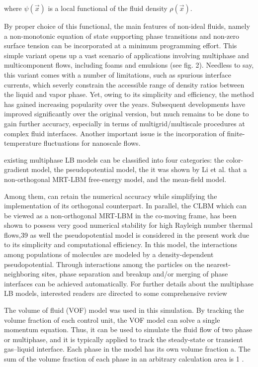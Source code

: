 where $\psi(\vec{x})$ is a local functional of the fluid density $\rho(\vec{x})$.

By proper choice of this functional, the main features of non-ideal fluids, namely a non-monotonic equation of state supporting phase transitions and non-zero surface tension can be incorporated at a minimum programming effort. This simple variant opens up a vast scenario of applications involving multiphase and multicomponent flows, including foams and emulsions (see fig. 2). Needless to say, this variant comes with a number of limitations, such as spurious interface currents, which severly constrain the accessible range of density ratios between the liquid and vapor phase. Yet, owing to its simplicity and efficiency, the method has gained increasing popularity over the years. Subsequent developments have improved significantly over the original version, but much remains to be done to gain further accuracy, especially in terms of multigrid/multiscale procedures at complex fluid interfaces. Another important issue is the incorporation of finite-temperature fluctuations for nanoscale flows.

existing multiphase LB models can be classified into four categories: the color-gradient model, the pseudopotential model, the it was shown by Li et al. that a non-orthogonal MRT-LBM free-energy model, and the mean-field model.
%

Among them, can retain the numerical accuracy while simplifying the implementation of its orthogonal counterpart. In parallel, the CLBM which can be viewed as a non-orthogonal MRT-LBM in the co-moving frame, has been shown to possess very good numerical stability for high Rayleigh number thermal flows,39 as well the pseudopotential model is considered in the present work due to its simplicity and computational efficiency. In this model, the interactions among populations of molecules are modeled by a density-dependent pseudopotential. Through interactions among the particles on the nearest-neighboring sites, phase separation and breakup and/or merging of phase interfaces can be achieved automatically. For further details about the multiphase LB models, interested readers are directed to some comprehensive review

The volume of fluid (VOF) model was used in this simulation. By tracking the volume fraction of each control unit, the VOF model can solve a single momentum equation. Thus, it can be used to simulate the fluid flow of two phase or multiphase, and it is typically applied to track the steady-state or transient gas–liquid interface.
Each phase in the model has its own volume fraction a. The sum of the volume fraction of each phase in an arbitrary calculation area is 1 \cite{lvSimulationFlowFluid}.
%

